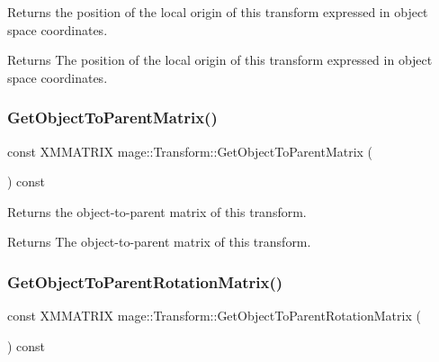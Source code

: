 Returns the position of the local origin of this transform expressed in object space coordinates.

\begin{DoxyReturn}{Returns}
The position of the local origin of this transform expressed in object space coordinates. 
\end{DoxyReturn}
\hypertarget{structmage_1_1_transform_a1171e7ebcdaea6329871a3c8946dbfe6}{}\label{structmage_1_1_transform_a1171e7ebcdaea6329871a3c8946dbfe6} 
\subsubsection{\texorpdfstring{Get\+Object\+To\+Parent\+Matrix()}{GetObjectToParentMatrix()}}
{\footnotesize\ttfamily const X\+M\+M\+A\+T\+R\+IX mage\+::\+Transform\+::\+Get\+Object\+To\+Parent\+Matrix (\begin{DoxyParamCaption}{ }\end{DoxyParamCaption}) const\hspace{0.3cm}{\ttfamily [noexcept]}}

Returns the object-\/to-\/parent matrix of this transform.

\begin{DoxyReturn}{Returns}
The object-\/to-\/parent matrix of this transform. 
\end{DoxyReturn}
\hypertarget{structmage_1_1_transform_a33204680aad4ec80d99e1f3747a0ee2b}{}\label{structmage_1_1_transform_a33204680aad4ec80d99e1f3747a0ee2b} 
\subsubsection{\texorpdfstring{Get\+Object\+To\+Parent\+Rotation\+Matrix()}{GetObjectToParentRotationMatrix()}}
{\footnotesize\ttfamily const X\+M\+M\+A\+T\+R\+IX mage\+::\+Transform\+::\+Get\+Object\+To\+Parent\+Rotation\+Matrix (\begin{DoxyParamCaption}{ }\end{DoxyParamCaption}) const\hspace{0.3cm}{\ttfamily [noexcept]}}

